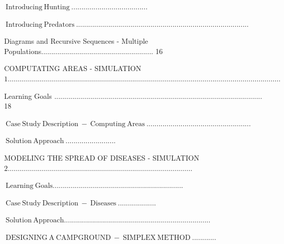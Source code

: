 \documentclass[10pt]{article}
\begin{document}
$\mathrm{~ I n t r o d u c i n g ~ H u n t i n g ~ . . . . . . . . . . . . . . . . . . . . . . . . . . . . . . . . . . . . . .}$

$\mathrm{~ I n t r o d u c i n g ~ P r e d a t o r s ~ . . . . . . . . . . . . . . . . . . . . . . . . . . . . . . . . . . . . . . . . . . . . . . . . . . . . . . . . . . . . . . . . . . . . . . . . . . . . . . . . . . . . . .}$

Diagrams and Recursive Sequences - Multiple Populations........................................................ 16

COMPUTATING AREAS - SIMULATION $1 \ldots \ldots \ldots \ldots \ldots \ldots \ldots \ldots \ldots \ldots \ldots \ldots \ldots \ldots \ldots \ldots \ldots \ldots \ldots \ldots \ldots \ldots \ldots \ldots \ldots \ldots \ldots . \ldots \ldots \ldots \ldots \ldots \ldots \ldots \ldots \ldots \ldots \ldots \ldots \ldots \ldots \ldots \ldots \ldots \ldots$

Learning Goals ........................................................................................................ 18

$\mathrm{~ C a s e ~ S t u d y ~ D e s c r i p t i o n ~ - ~ C o m p u t i n g ~ A r e a s ~ . . . . . . . . . . . . . . . . . . . . . . . . . . . . . . . . . . . . . . . . . . . . . . . . . . . .}$

$\mathrm{~ S o l u t i o n ~ A p p r o a c h ~ . . . . . . . . . . . . . . . . . . . . . . . . .}$

MODELING THE SPREAD OF DISEASES - SIMULATION $2 \ldots \ldots \ldots \ldots \ldots \ldots \ldots \ldots \ldots \ldots \ldots \ldots \ldots \ldots \ldots \ldots \ldots \ldots \ldots \ldots \ldots \ldots \ldots \ldots \ldots \ldots \ldots \ldots . . \ldots \ldots$

$\mathrm{~ L e a r n i n g ~ G o a l s . . . . . . . . . . . . . . . . . . . . . . . . . . . . . . . . . . . . . . . . . . . . . . . . . . . . . . . . . . . . . . . . .}$

$\mathrm{~ C a s e ~ S t u d y ~ D e s c r i p t i o n ~ - ~ D i s e a s e s ~ . . . . . . . . . . . . . . . . . . .}$

$\mathrm{~ S o l u t i o n ~ A p p r o a c h . . . . . . . . . . . . . . . . . . . . . . . . . . . . . . . . . . . . . . . . . . . . . . . . . . . . . . . . . . . . . . . . . . . . . . . . .}$

$\mathrm{~ D E S I G N I N G ~ A ~ C A M P G R O U N D ~ - ~ S I M P L E X ~ M E T H O D ~ . . . . . . . . . . . .}$
\end{document}
